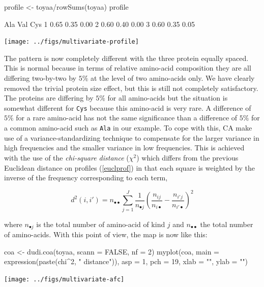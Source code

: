 \documentclass{article}
\begin{document}
\begin{Schunk}
\begin{Sinput}
 profile <- toyaa/rowSums(toyaa)
 profile
\end{Sinput}
\begin{Soutput}
   Ala  Val  Cys
1 0.65 0.35 0.00
2 0.60 0.40 0.00
3 0.60 0.35 0.05
\end{Soutput}
\end{Schunk}
\texttt{[image: ../figs/multivariate-profile]}

The pattern is now completely different with the three protein equally spaced.
This is normal because in terms of relative amino-acid composition they are
all differing two-by-two by $5\%$ at the level of two amino-acids only. We
have clearly removed the trivial protein size effect, but this is still not completely
satisfactory. The proteins are differing by $5\%$ for all amino-acids but the situation 
is somewhat different for \texttt{Cys} because this amino-acid is very rare.
A difference of $5\%$ for a rare amino-acid has not the same significance than
a difference of $5\%$ for a common amino-acid such as \texttt{Ala} in our
example. To cope with this, CA make use of a variance-standardizing
technique to compensate for the larger variance in high frequencies and the 
smaller variance in low frequencies. This is achieved with the use of the 
\emph{chi-square distance} ($\chi^2$) which differs from the previous Euclidean distance 
on profiles (\ref{euclprof}) in that each square is weighted by the inverse of 
the frequency corresponding to each term,

\begin{equation}
d^2(i,i') = n_{\bullet\bullet}\sum_{j=1}^{J}\frac{1}{n_{{\bullet}j}}(\frac{n_{ij}}{n_{i\bullet}} - \frac{n_{i'j}}{n_{i'\bullet}})^2
\label{chi}
\end{equation}

where $n_{{\bullet}j}$ is the total number of amino-acid of kind $j$ and
$n_{\bullet\bullet}$ the total number of amino-acids. With this point
of view, the map is now like this:

\begin{Schunk}
\begin{Sinput}
 coa <- dudi.coa(toyaa, scann = FALSE, nf = 2)
 myplot(coa, main = expression(paste(chi^2, " distance")), 
     asp = 1, pch = 19, xlab = "", ylab = "")
\end{Sinput}
\end{Schunk}
\texttt{[image: ../figs/multivariate-afc]}
\end{document}
